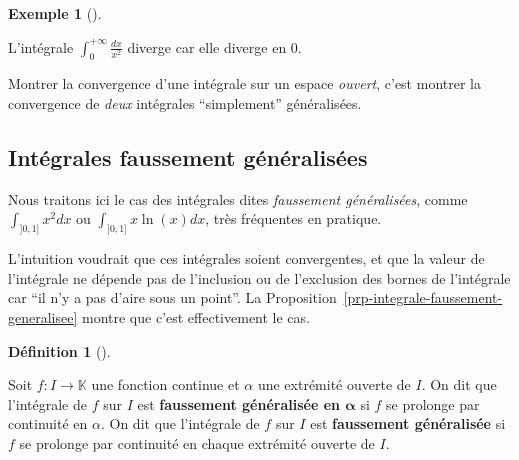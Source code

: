 \documentclass[
  french,
  letterpaper,
  DIV=11,
  numbers=noendperiod]{scrreprt}
\theoremstyle{plain}
\theoremstyle{definition}
\newtheorem{definition}{Définition}[chapter]
\theoremstyle{plain}
\theoremstyle{plain}
\theoremstyle{definition}
\theoremstyle{definition}
\newtheorem{example}{Exemple}[chapter]
\theoremstyle{plain}
\theoremstyle{remark}
\newcounter{quartocallouttipno}
\newcommand{\quartocallouttip}[1]{\refstepcounter{quartocallouttipno}\label{#1}}
\begin{document}
\begin{example}[]\protect\hypertarget{exm-ouvert-divergente}{}\label{exm-ouvert-divergente}

L'intégrale \(\int_{0}^{+\infty}\frac{dx}{x^{2}}\) diverge car elle
diverge en \(0\).

\end{example}

\begin{tcolorbox}[enhanced jigsaw, arc=.35mm, bottomrule=.15mm, bottomtitle=1mm, breakable, colback=white, colbacktitle=quarto-callout-tip-color!10!white, colframe=quarto-callout-tip-color-frame, coltitle=black, left=2mm, leftrule=.75mm, opacityback=0, opacitybacktitle=0.6, rightrule=.15mm, title=\textcolor{quarto-callout-tip-color}{\faLightbulb}\hspace{0.5em}{Astuce \ref*{tip-ouvert}}, titlerule=0mm, toprule=.15mm, toptitle=1mm]

\quartocallouttip{tip-ouvert} 

Montrer la convergence d'une intégrale sur un espace \emph{ouvert},
c'est montrer la convergence de \emph{deux} intégrales ``simplement''
généralisées.

\end{tcolorbox}

\subsection{Intégrales faussement
généralisées}\label{sec-integrale-faussement-generalisee}

Nous traitons ici le cas des intégrales dites \emph{faussement
généralisées}, comme \(\int_{]0,1]}x^{2}dx\) ou
\(\int_{]0,1]}x\ln(x)dx\), très fréquentes en pratique.

L'intuition voudrait que ces intégrales soient convergentes, et que la
valeur de l'intégrale ne dépende pas de l'inclusion ou de l'exclusion
des bornes de l'intégrale car ``il n'y a pas d'aire sous un point''. La
Proposition~\ref{prp-integrale-faussement-generalisee} montre que c'est
effectivement le cas.

\begin{definition}[]\protect\hypertarget{def-faussement-generalisee}{}\label{def-faussement-generalisee}

Soit \(f:I \to \mathbb{K}\) une fonction continue et \(\alpha\) une
extrémité ouverte de \(I\). On dit que l'intégrale de \(f\) sur \(I\)
est \textbf{faussement généralisée en \(\boldsymbol{\alpha}\)} si \(f\)
se prolonge par continuité en \(\alpha\). On dit que l'intégrale de
\(f\) sur \(I\) est \textbf{faussement généralisée} si \(f\) se prolonge
par continuité en chaque extrémité ouverte de \(I\).

\end{definition}
\end{document}
